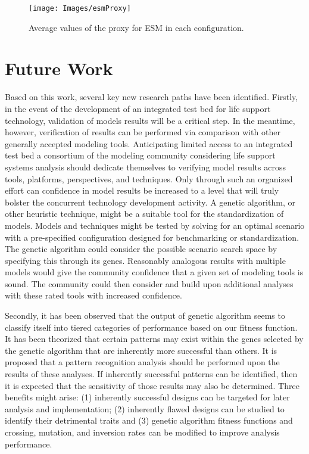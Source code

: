\documentclass[submit]{aiaa}
\begin{document}
\begin{figure}[htb]
\texttt{[image: Images/esmProxy]}
\caption{Average values of the proxy for ESM in each configuration.}
\label{fig:esm}
\end{figure}

\section{Future Work}

Based on this work, several key new research paths have been identified.
Firstly, in the event of the development of an integrated test bed for life support technology, validation of models results will be a critical step.
In the meantime, however, verification of results can be performed via comparison with other generally accepted modeling tools.
Anticipating limited access to an integrated test bed a consortium of the modeling community considering life support systems analysis should dedicate themselves to verifying model results across tools, platforms, perspectives, and techniques.
Only through such an organized effort can confidence in model results be increased to a level that will truly bolster the concurrent technology development activity.
A genetic algorithm, or other heuristic technique, might be a suitable tool for the standardization of models.
Models and techniques might be tested by solving for an optimal scenario with a pre-specified configuration designed for benchmarking or standardization.
The genetic algorithm could consider the possible scenario search space by specifying this through its genes.
Reasonably analogous results with multiple models would give the community confidence that a given set of modeling tools is sound.
The community could then consider and build upon additional analyses with these rated tools with increased confidence.

Secondly, it has been observed that the output of genetic algorithm seems to classify itself into tiered categories of performance based on our fitness function.
It has been theorized that certain patterns may exist within the genes selected by the genetic algorithm that are inherently more successful than others.
It is proposed that a pattern recognition analysis should be performed upon the results of these analyses.
If inherently successful patterns can be identified, then it is expected that the sensitivity of those results may also be determined.
Three benefits might arise: (1) inherently successful designs can be targeted for later analysis and implementation; (2) inherently flawed designs can be studied to identify their detrimental traits and (3) genetic algorithm fitness functions and crossing, mutation, and inversion rates can be modified to improve analysis performance.
\end{document}
